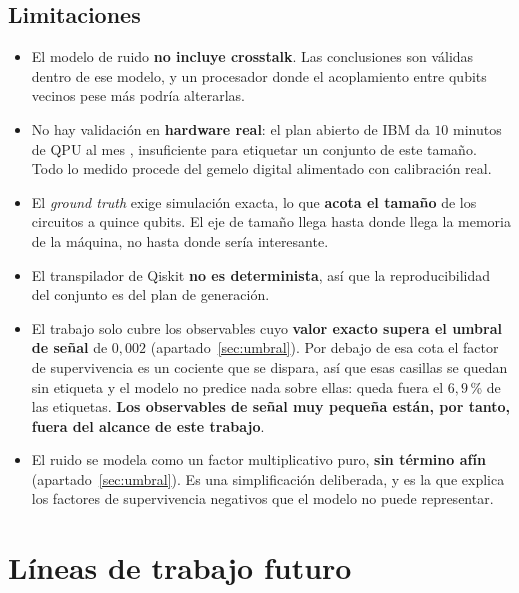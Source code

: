 \subsection*{Limitaciones}

\begin{itemize}
    \item El modelo de ruido \textbf{no incluye crosstalk}. Las conclusiones son válidas dentro
          de ese modelo, y un procesador donde el acoplamiento entre qubits vecinos pese más
          podría alterarlas.
    \item No hay validación en \textbf{hardware real}: el plan abierto de IBM da $10$ minutos de
          QPU al mes \cite{ibm2026productos}, insuficiente para etiquetar un conjunto de este
          tamaño. Todo lo medido procede del gemelo digital alimentado con calibración real.
    \item El \textit{ground truth} exige simulación exacta, lo que \textbf{acota el tamaño} de
          los circuitos a quince qubits. El eje de tamaño llega hasta donde llega la memoria de
          la máquina, no hasta donde sería interesante.
    \item El transpilador de Qiskit \textbf{no es determinista}, así que la reproducibilidad del
          conjunto es del plan de generación.
    \item El trabajo solo cubre los observables cuyo \textbf{valor exacto supera el umbral de
          señal} de $0{,}002$ (apartado~\ref{sec:umbral}). Por debajo de esa cota el factor de
          supervivencia es un cociente que se dispara, así que esas casillas se quedan sin
          etiqueta y el modelo no predice nada sobre ellas: queda fuera el $6{,}9$\,\% de las
          etiquetas. \textbf{Los observables de señal muy pequeña están, por tanto, fuera del
          alcance de este trabajo}.
    \item El ruido se modela como un factor multiplicativo puro, \textbf{sin término afín}
          (apartado~\ref{sec:umbral}). Es una simplificación deliberada, y es la que explica
          los factores de supervivencia negativos que el modelo no puede representar.
\end{itemize}

\section{Líneas de trabajo futuro}
\label{sec:futuro}

